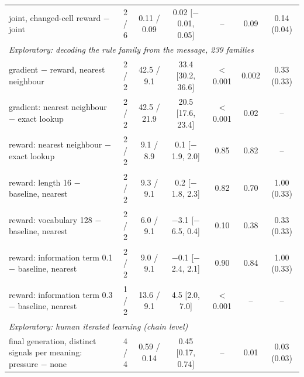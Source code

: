\begin{tabular}{lcccccc}
\quad joint, changed-cell reward $-$ joint & 2 / 6 & 0.11 / 0.09 & 0.02 [$-$0.01, 0.05] & -- & 0.09 & 0.14 (0.04) \\
\multicolumn{7}{l}{\emph{Exploratory: decoding the rule family from the message, 239 families}} \\
\quad gradient $-$ reward, nearest neighbour & 2 / 2 & 42.5 / 9.1 & 33.4 [30.2, 36.6] & $<$0.001 & 0.002 & 0.33 (0.33) \\
\quad gradient: nearest neighbour $-$ exact lookup & 2 / 2 & 42.5 / 21.9 & 20.5 [17.6, 23.4] & $<$0.001 & 0.02 & -- \\
\quad reward: nearest neighbour $-$ exact lookup & 2 / 2 & 9.1 / 8.9 & 0.1 [$-$1.9, 2.0] & 0.85 & 0.82 & -- \\
\quad reward: length 16 $-$ baseline, nearest & 2 / 2 & 9.3 / 9.1 & 0.2 [$-$1.8, 2.3] & 0.82 & 0.70 & 1.00 (0.33) \\
\quad reward: vocabulary 128 $-$ baseline, nearest & 2 / 2 & 6.0 / 9.1 & $-$3.1 [$-$6.5, 0.4] & 0.10 & 0.38 & 0.33 (0.33) \\
\quad reward: information term 0.1 $-$ baseline, nearest & 2 / 2 & 9.0 / 9.1 & $-$0.1 [$-$2.4, 2.1] & 0.90 & 0.84 & 1.00 (0.33) \\
\quad reward: information term 0.3 $-$ baseline, nearest & 1 / 2 & 13.6 / 9.1 & 4.5 [2.0, 7.0] & $<$0.001 & -- & -- \\
\multicolumn{7}{l}{\emph{Exploratory: human iterated learning (chain level)}} \\
\quad final generation, distinct signals per meaning: pressure $-$ none & 4 / 4 & 0.59 / 0.14 & 0.45 [0.17, 0.74] & -- & 0.01 & 0.03 (0.03) \\
\bottomrule
\end{tabular}
